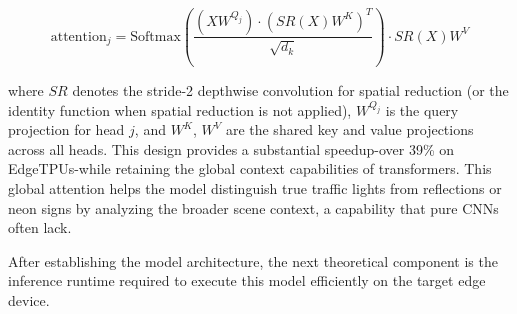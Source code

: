 \begin{equation}
    \text{attention}_j = \text{Softmax}\left(\frac{(X W^{Q_j}) \cdot (SR(X) W^K)^T}{\sqrt{d_k}}\right) \cdot SR(X) W^V
\end{equation}

where $SR$ denotes the stride-2 depthwise convolution for spatial reduction (or the identity function when spatial reduction is not applied), $W^{Q_j}$ is the query projection for head $j$, and $W^K$, $W^V$ are the shared key and value projections across all heads. This design provides a substantial speedup-over 39\% on EdgeTPUs-while retaining the global context capabilities of transformers. This global attention helps the model distinguish true traffic lights from reflections or neon signs by analyzing the broader scene context, a capability that pure CNNs often lack.

After establishing the model architecture, the next theoretical component is the inference runtime required to execute this model efficiently on the target edge device.





